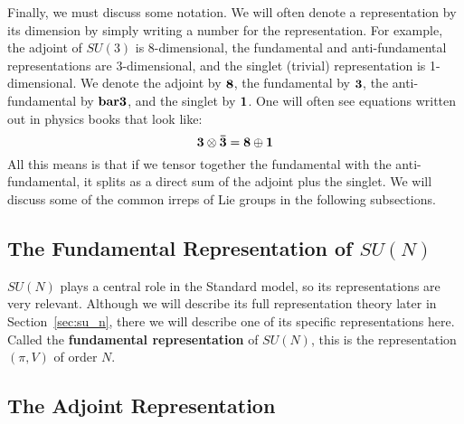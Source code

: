 \documentclass[11pt, oneside]{article}   	%
\theoremstyle{definition}
\begin{document}
Finally, we must discuss some notation. We will often denote a representation by its dimension 
by simply writing a number for the representation. For example, the adjoint of $SU(3)$ is 8-dimensional, the fundamental 
and anti-fundamental representations are 3-dimensional, and the singlet (trivial) representation is 1-dimensional. We denote the 
adjoint by $\bf{8}$, the fundamental by $\bf 3$, the anti-fundamental by $\bf{bar 3}$, and the singlet by $\bf 1$. One will often 
see equations written out in physics books that look like:
\begin{equation}
	\bf 3\otimes \bar{3} = 8\oplus 1
\end{equation}
All this means is that if we tensor together the fundamental with the anti-fundamental, it splits as a direct sum of the adjoint 
plus the singlet. We will discuss some of the common irreps of Lie groups in the following subsections.

\subsection{The Fundamental Representation of $SU(N)$}

$SU(N)$ plays a central role in the Standard model, so its representations are very relevant. 
Although we will describe its full representation theory later in Section~\ref{sec:su_n}, there we will 
describe one of its specific representations here. Called the \textbf{fundamental representation} of 
$SU(N)$, this is the representation $(\pi, V)$ of order $N$. 

\subsection{The Adjoint Representation}
\end{document}

